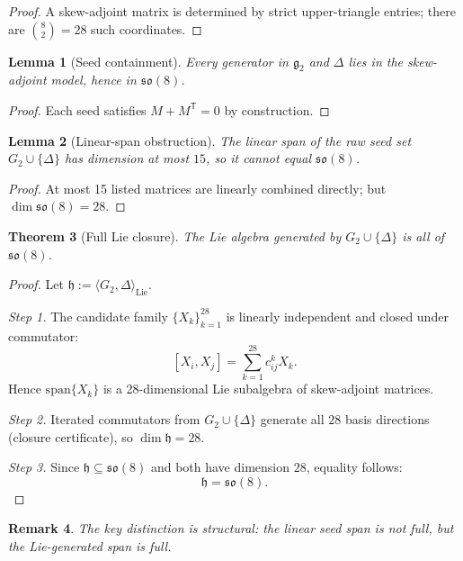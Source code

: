 \documentclass[11pt]{amsart}
\newtheorem{theorem}{Theorem}[section]
\newtheorem{lemma}[theorem]{Lemma}
\newtheorem{remark}[theorem]{Remark}
\begin{document}
\begin{proof}
A skew-adjoint matrix is determined by strict upper-triangle entries; there are $\binom82=28$ such coordinates.
\end{proof}

\begin{lemma}[Seed containment]
Every generator in $\mathfrak g_2$ and $\Delta$ lies in the skew-adjoint model, hence in $\mathfrak{so}(8)$.
\end{lemma}

\begin{proof}
Each seed satisfies $M+M^{\mathsf T}=0$ by construction.
\end{proof}

\begin{lemma}[Linear-span obstruction]
The linear span of the raw seed set $G_2\cup\{\Delta\}$ has dimension at most $15$, so it cannot equal $\mathfrak{so}(8)$.
\end{lemma}

\begin{proof}
At most 15 listed matrices are linearly combined directly; but $\dim\mathfrak{so}(8)=28$.
\end{proof}

\begin{theorem}[Full Lie closure]
\label{thm:full-lie-closure}
The Lie algebra generated by $G_2\cup\{\Delta\}$ is all of $\mathfrak{so}(8)$.
\end{theorem}

\begin{proof}
Let $\mathfrak h:=\langle G_2,\Delta\rangle_{\mathrm{Lie}}$.

\emph{Step 1.} The candidate family $\{X_k\}_{k=1}^{28}$ is linearly independent and closed under commutator:
\[
[X_i,X_j]=\sum_{k=1}^{28} c_{ij}^k X_k.
\]
Hence $\mathrm{span}\{X_k\}$ is a 28-dimensional Lie subalgebra of skew-adjoint matrices.

\emph{Step 2.} Iterated commutators from $G_2\cup\{\Delta\}$ generate all $28$ basis directions (closure certificate), so $\dim\mathfrak h=28$.

\emph{Step 3.} Since $\mathfrak h\subseteq\mathfrak{so}(8)$ and both have dimension $28$, equality follows:
\[
\mathfrak h=\mathfrak{so}(8).
\]
\end{proof}

\begin{remark}
The key distinction is structural: the \emph{linear} seed span is not full, but the \emph{Lie-generated} span is full.
\end{remark}
\end{document}
